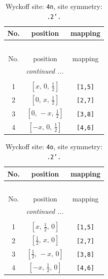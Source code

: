 \documentclass[fleqn,8pt]{jsarticle}
\begin{document}
\renewcommand{\arraystretch}{1.2}
\begin{longtable}{ccc}
\caption{Wyckoff site: {\tt 4n}, site symmetry: {\tt .2'.}}
 \\
 \hline \hline
No. & position & mapping \\ \hline \endfirsthead

\multicolumn{2}{l}{\tablename\ \thetable{}} \\
 \hline \hline
No. & position & mapping \\ \hline \endhead

 \hline \hline
\multicolumn{2}{r}{\footnotesize\it continued ...} \\ \endfoot

 \hline \hline
\multicolumn{2}{r}{} \\ \endlastfoot

1 & $\left[ x,\, 0,\, \frac{1}{2} \right]$ & {\tt [1,5]} \\ \hline
2 & $\left[ 0,\, x,\, \frac{1}{2} \right]$ & {\tt [2,7]} \\ \hline
3 & $\left[ 0,\, - x,\, \frac{1}{2} \right]$ & {\tt [3,8]} \\ \hline
4 & $\left[ - x,\, 0,\, \frac{1}{2} \right]$ & {\tt [4,6]} \\
\end{longtable}
\renewcommand{\arraystretch}{1.2}
\begin{longtable}{ccc}
\caption{Wyckoff site: {\tt 4o}, site symmetry: {\tt .2'.}}
 \\
 \hline \hline
No. & position & mapping \\ \hline \endfirsthead

\multicolumn{2}{l}{\tablename\ \thetable{}} \\
 \hline \hline
No. & position & mapping \\ \hline \endhead

 \hline \hline
\multicolumn{2}{r}{\footnotesize\it continued ...} \\ \endfoot

 \hline \hline
\multicolumn{2}{r}{} \\ \endlastfoot

1 & $\left[ x,\, \frac{1}{2},\, 0 \right]$ & {\tt [1,5]} \\ \hline
2 & $\left[ \frac{1}{2},\, x,\, 0 \right]$ & {\tt [2,7]} \\ \hline
3 & $\left[ \frac{1}{2},\, - x,\, 0 \right]$ & {\tt [3,8]} \\ \hline
4 & $\left[ - x,\, \frac{1}{2},\, 0 \right]$ & {\tt [4,6]} \\
\end{longtable}
\end{document}
